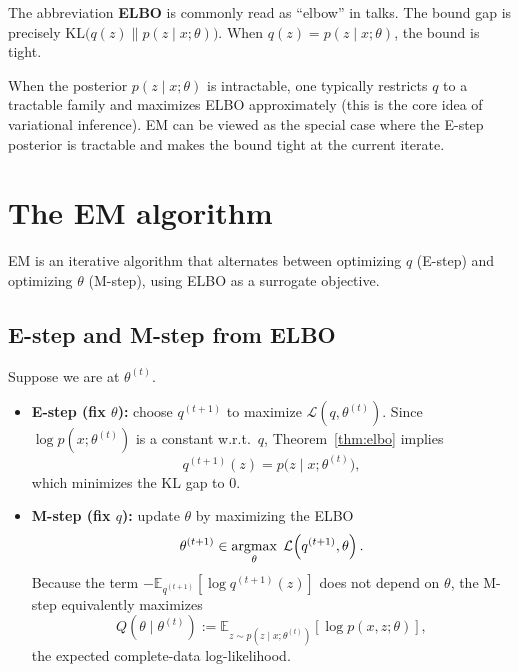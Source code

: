 \documentclass[../main]{subfiles}
\begin{document}
\begin{remark}
    The abbreviation \textbf{ELBO} is commonly read as ``elbow'' in talks.
    The bound gap is precisely
    $\mathrm{KL}\big(q(z)\|p(z\mid x;\theta)\big)$.
    When $q(z)=p(z\mid x;\theta)$, the bound is tight.
\end{remark}

\begin{note}
    When the posterior $p(z\mid x;\theta)$ is intractable, one typically
    restricts $q$ to a tractable family and maximizes ELBO approximately (this
    is the core idea of variational inference). EM can be viewed as the special
    case where the E-step posterior is tractable and makes the bound tight at
    the current iterate.
\end{note}

\section{The EM algorithm}
EM is an iterative algorithm that alternates between optimizing $q$ (E-step)
and optimizing $\theta$ (M-step), using ELBO as a surrogate objective.

\subsection{E-step and M-step from ELBO}
Suppose we are at $\theta^{(t)}$.
\begin{itemize}
    \item \textbf{E-step (fix $\theta$):}
    choose $q^{(t+1)}$ to maximize $\mathcal L(q,\theta^{(t)})$.
    Since $\log p(x;\theta^{(t)})$ is a constant w.r.t.\ $q$,
    Theorem~\ref{thm:elbo} implies
    \begin{equation}\label{eq:e-step}
        q^{(t+1)}(z)
        =
        p\bigl(z\mid x;\theta^{(t)}\bigr),
    \end{equation}
    which minimizes the KL gap to $0$.

    \item \textbf{M-step (fix $q$):}
    update $\theta$ by maximizing the ELBO
    \begin{equation}\label{eq:m-step}
        \theta^{(t+1)}
        \in
        \mathop{\mathrm{argmax}}_{\theta}\; \mathcal L\!\left(q^{(t+1)},\theta\right).
    \end{equation}
    Because the term $-\mathbb E_{q^{(t+1)}}[\log q^{(t+1)}(z)]$ does not depend
    on $\theta$, the M-step equivalently maximizes
    \begin{equation}\label{eq:q-function}
        Q(\theta\mid \theta^{(t)})
        :=
        \mathbb E_{z\sim p(z\mid x;\theta^{(t)})}\!\left[\log p(x,z;\theta)\right],
    \end{equation}
    the expected complete-data log-likelihood.
\end{itemize}
\end{document}
